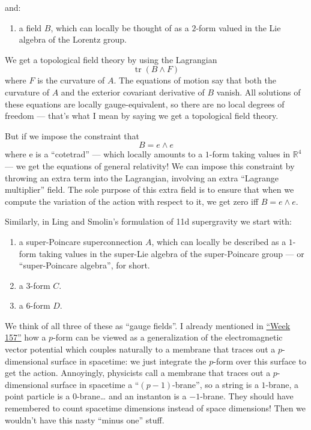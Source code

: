 \documentclass{article}
\def\tightlist{}
\begin{document}
and:

\begin{enumerate}
\def\labelenumi{\alph{enumi})}
\setcounter{enumi}{1}
\tightlist
\item
  a field \(B\), which can locally be thought of as a \(2\)-form valued
  in the Lie algebra of the Lorentz group.
\end{enumerate}

We get a topological field theory by using the Lagrangian
\[\operatorname{tr}(B \wedge F)\] where \(F\) is the curvature of \(A\).
The equations of motion say that both the curvature of \(A\) and the
exterior covariant derivative of \(B\) vanish. All solutions of these
equations are locally gauge-equivalent, so there are no local degrees of
freedom --- that's what I mean by saying we get a topological field
theory.

But if we impose the constraint that \[B = e\wedge e\] where e is a
``cotetrad'' --- which locally amounts to a \(1\)-form taking values in
\(\mathbb{R}^4\) --- we get the equations of general relativity! We can
impose this constraint by throwing an extra term into the Lagrangian,
involving an extra ``Lagrange multiplier'' field. The sole purpose of
this extra field is to ensure that when we compute the variation of the
action with respect to it, we get zero iff \(B = e\wedge e\).

Similarly, in Ling and Smolin's formulation of 11d supergravity we start
with:

\begin{enumerate}
\def\labelenumi{\alph{enumi})}
\item
  a super-Poincare superconnection \(A\), which can locally be described
  as a \(1\)-form taking values in the super-Lie algebra of the
  super-Poincare group --- or ``super-Poincare algebra'', for short.
\item
  a \(3\)-form \(C\).
\item
  a \(6\)-form \(D\).
\end{enumerate}

We think of all three of these as ``gauge fields''. I already mentioned
in \protect\hyperlink{week157}{``Week 157''} how a \(p\)-form can be
viewed as a generalization of the electromagnetic vector potential which
couples naturally to a membrane that traces out a \(p\)-dimensional
surface in spacetime: we just integrate the \(p\)-form over this surface
to get the action. Annoyingly, physicists call a membrane that traces
out a \(p\)-dimensional surface in spacetime a ``\((p-1)\)-brane'', so a
string is a \(1\)-brane, a point particle is a \(0\)-brane\ldots{} and
an instanton is a \(-1\)-brane. They should have remembered to count
spacetime dimensions instead of space dimensions! Then we wouldn't have
this nasty ``minus one'' stuff.
\end{document}
